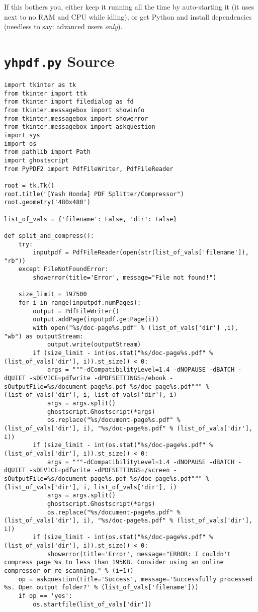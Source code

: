 \documentclass[9pt]{report}
\begin{document}
If this bothers you, either keep it running all the time by
auto-starting it (it uses next to no RAM and CPU while idling), or
get Python and install dependencies (needless to say: advanced
users \emph{only}).

\chapter{\texttt{yhpdf.py} Source}
\label{sec:org45cd4e5}

\begin{verbatim}
import tkinter as tk
from tkinter import ttk
from tkinter import filedialog as fd
from tkinter.messagebox import showinfo
from tkinter.messagebox import showerror
from tkinter.messagebox import askquestion
import sys
import os
from pathlib import Path
import ghostscript
from PyPDF2 import PdfFileWriter, PdfFileReader

root = tk.Tk()
root.title("[Yash Honda] PDF Splitter/Compressor")
root.geometry('480x480')

list_of_vals = {'filename': False, 'dir': False}

def split_and_compress():
    try:
        inputpdf = PdfFileReader(open(str(list_of_vals['filename']), "rb"))
    except FileNotFoundError:
        showerror(title='Error', message="File not found!")

    size_limit = 197500
    for i in range(inputpdf.numPages):
        output = PdfFileWriter()
        output.addPage(inputpdf.getPage(i))
        with open("%s/doc-page%s.pdf" % (list_of_vals['dir'] ,i), "wb") as outputStream:
            output.write(outputStream)
        if (size_limit - int(os.stat("%s/doc-page%s.pdf" % (list_of_vals['dir'], i)).st_size)) < 0:
            args = """-dCompatibilityLevel=1.4 -dNOPAUSE -dBATCH -dQUIET -sDEVICE=pdfwrite -dPDFSETTINGS=/ebook -sOutputFile=%s/document-page%s.pdf %s/doc-page%s.pdf""" % (list_of_vals['dir'], i, list_of_vals['dir'], i)
            args = args.split()
            ghostscript.Ghostscript(*args)
            os.replace("%s/document-page%s.pdf" % (list_of_vals['dir'], i), "%s/doc-page%s.pdf" % (list_of_vals['dir'], i))
        if (size_limit - int(os.stat("%s/doc-page%s.pdf" % (list_of_vals['dir'], i)).st_size)) < 0:
            args = """-dCompatibilityLevel=1.4 -dNOPAUSE -dBATCH -dQUIET -sDEVICE=pdfwrite -dPDFSETTINGS=/screen -sOutputFile=%s/document-page%s.pdf %s/doc-page%s.pdf""" % (list_of_vals['dir'], i, list_of_vals['dir'], i)
            args = args.split()
            ghostscript.Ghostscript(*args)
            os.replace("%s/document-page%s.pdf" % (list_of_vals['dir'], i), "%s/doc-page%s.pdf" % (list_of_vals['dir'], i))
        if (size_limit - int(os.stat("%s/doc-page%s.pdf" % (list_of_vals['dir'], i)).st_size)) < 0:
            showerror(title='Error', message="ERROR: I couldn't compress page %s to less than 195KB. Consider using an online compressor or re-scanning." % (i+1))
    op = askquestion(title='Success', message='Successfully processed %s. Open output folder?' % (list_of_vals['filename']))
    if op == 'yes':
        os.startfile(list_of_vals['dir'])


\end{verbatim}
\end{document}
